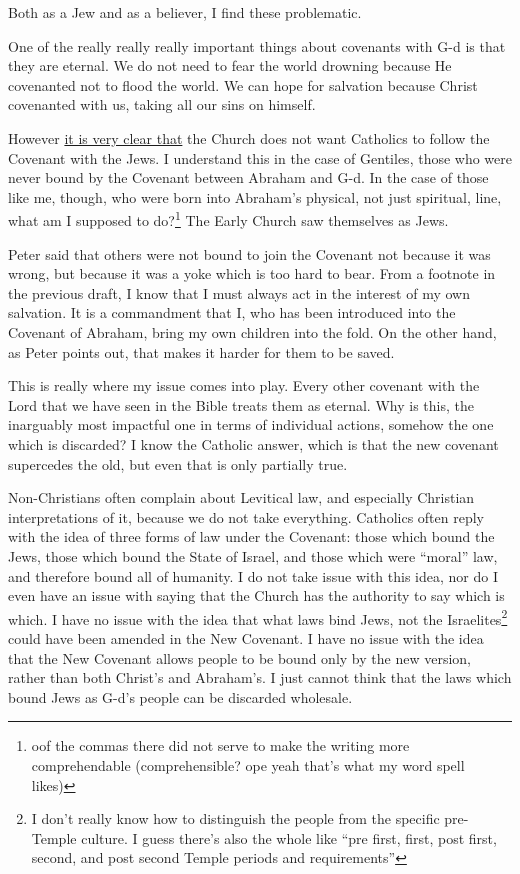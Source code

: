\documentclass[12pt]{article}
\newcommand{\say}[1]{``#1''}
\renewcommand{\,}{\textsuperscript{,}}
\begin{document}
Both as a Jew and as a believer, I find these problematic.

One of the really really really important things about covenants with G-d is that they are eternal.  
We do not need to fear the world drowning because He covenanted not to flood the world.  
We can hope for salvation because Christ covenanted with us, taking all our sins on himself.

However \href{https://catholicism.org/ad-rem-no-63.html}{it is very clear that} the Church does not want Catholics to follow the Covenant with the Jews.  
I understand this in the case of Gentiles, those who were never bound by the Covenant between Abraham and G-d.  
In the case of those like me, though, who were born into Abraham's physical, not just spiritual, line, what am I supposed to do?\footnote{oof the commas there did not serve to make the writing more comprehendable (comprehensible? ope yeah that's what my word spell likes)}  
The Early Church saw themselves as Jews.  
  
Peter said that others were not bound to join the Covenant not because it was wrong, but because it was a yoke which is too hard to bear.  
From a footnote in the previous draft, I know that I must always act in the interest of my own salvation.  
It is a commandment that I, who has been introduced into the Covenant of Abraham, bring my own children into the fold.  
On the other hand, as Peter points out, that makes it harder for them to be saved.

This is really where my issue comes into play.  
Every other covenant with the Lord that we have seen in the Bible treats them as eternal.  
Why is this, the inarguably most impactful one in terms of individual actions, somehow the one which is discarded?  
I know the Catholic answer, which is that the new covenant supercedes the old, but even that is only partially true.

Non-Christians often complain about Levitical law, and especially Christian interpretations of it, because we do not take everything.  
Catholics often reply with the idea of three forms of law under the Covenant: those which bound the Jews, those which bound the State of Israel, and those which were \say{moral} law, and therefore bound all of humanity.  
I do not take issue with this idea, nor do I even have an issue with saying that the Church has the authority to say which is which.  
I have no issue with the idea that what laws bind Jews, not the Israelites\footnote{I don't really know how to distinguish the people from the specific pre-Temple culture. I guess there's also the whole like \say{pre first, first, post first, second, and post second Temple periods and requirements}} could have been amended in the New Covenant.  
I have no issue with the idea that the New Covenant allows people to be bound only by the new version, rather than both Christ's and Abraham's.  
I just cannot think that the laws which bound Jews as G-d's people can be discarded wholesale.
\end{document}
